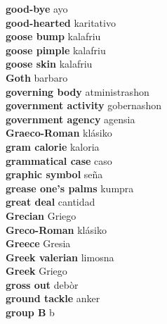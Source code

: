 \textbf{ good-bye  } ayo \\
\textbf{ good-hearted  } karitativo \\
\textbf{ goose bump  } kalafriu \\
\textbf{ goose pimple  } kalafriu \\
\textbf{ goose skin  } kalafriu \\
\textbf{ Goth  } barbaro \\
\textbf{ governing body  } atministrashon \\
\textbf{ government activity  } gobernashon \\
\textbf{ government agency  } agensia \\
\textbf{ Graeco-Roman  } klásiko \\
\textbf{ gram calorie  } kaloria \\
\textbf{ grammatical case  } caso \\
\textbf{ graphic symbol  } seña \\
\textbf{ grease one’s palms  } kumpra \\
\textbf{ great deal  } cantidad \\
\textbf{ Grecian  } Griego \\
\textbf{ Greco-Roman  } klásiko \\
\textbf{ Greece  } Gresia \\
\textbf{ Greek valerian  } limosna \\
\textbf{ Greek  } Griego \\
\textbf{ gross out  } debòr \\
\textbf{ ground tackle  } anker \\
\textbf{ group B  } b \\
